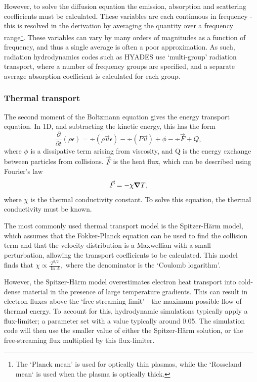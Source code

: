 However, to solve the diffusion equation the emission, absorption and scattering coefficients must be calculated. These variables are each continuous in frequency - this is resolved in the derivation by averaging the quantity over a frequency range\footnote{The `Planck mean' is used for optically thin plasmas, while the `Rosseland mean` is used when the plasma is optically thick.}. These variables can vary by many orders of magnitudes as a function of frequency, and thus a single average is often a poor approximation. As such, radiation hydrodynamics codes such as HYADES use `multi-group' radiation transport, where a number of frequency groups are specified, and a separate average absorption coefficient is calculated for each group.

\subsubsection{Thermal transport}

The second moment of the Boltzmann equation gives the energy transport equation. In 1D, and subtracting the kinetic energy, this has the form
\begin{equation} \frac{ \partial}{\partial t} (\rho \epsilon) = \div (\rho \vec{u} \epsilon) - \div (P \vec{u}) + \phi - \div \vec{F} + Q, \end{equation}
where $\phi$ is a dissipative term arising from viscosity, and Q is the energy exchange between particles from collisions. $\vec{F}$ is the heat flux, which can be described using Fourier's law 
\begin{equation} \vec{F} = - \chi \grad T, \end{equation} where $\chi$ is the thermal conductivity constant. To solve this equation, the thermal conductivity must be known.

The most commonly used thermal transport model is the Spitzer-H{\"a}rm model, which assumes that the Fokker-Planck equation can be used to find the collision term and that the velocity distribution is a Maxwellian with a small perturbation, allowing the transport coefficients to be calculated. This model finds that $\chi \propto \frac{T^{5/2}}{\ln{\Lambda}},$ where the denominator is the `Coulomb logarithm'.

However, the Spitzer-H{\"a}rm model overestimates electron heat transport into cold-dense material in the  presence of large temperature gradients. This can result in electron fluxes above the `free streaming limit'  - the maximum possible flow of thermal energy. To account for this, hydrodynamic simulations typically apply a flux-limiter; a parameter set with a value typically around 0.05. The simulation code will then use the smaller value of either the Spitzer-H{\"a}rm solution, or the free-streaming flux multiplied by this flux-limiter.

